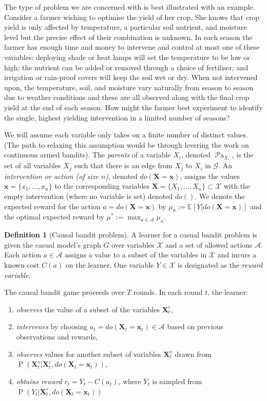 \documentclass[11pt,a4paper,oneside]{book}
\newcommand{\actions}{\mathcal{A}}
\newcommand{\actionspace}{\mathcal{A}}
\newcommand{\E}[1]{\mathbb E\left[{#1}\right]}
\renewcommand{\P}[1]{\operatorname{P}\left(#1\right)}
\newcommand{\parents}[1]{\operatorname{\mathcal{P}a}_{#1}}
\renewcommand{\vec}[1]{\boldsymbol{#1}}
\theoremstyle{plain}
\theoremstyle{definition}
\newtheorem{definition}[theorem]{Definition}
\begin{document}
The type of problem we are concerned with is best illustrated with an example. Consider a farmer wishing to optimise the yield of her crop. She knows that crop yield is only affected by temperature, a particular soil nutrient, and moisture level but the precise effect of their combination is unknown. In each season the farmer has enough time and money to intervene and control at most one of these
variables: deploying shade or heat lamps will set the temperature to be low or high; the nutrient can be added or removed through a choice of fertiliser; and irrigation or rain-proof covers will keep the soil wet or dry. When not intervened upon, the temperature, soil, and moisture vary naturally from season to season due to weather conditions and these are all observed along with the final crop yield at the end of each season. How might the farmer best experiment to identify the single, highest yielding intervention in a limited number of seasons?

We will assume each variable only takes on a finite number of distinct values. (The path to relaxing this assumption would be through levering the work on continuous armed bandits). The \emph{parents} of a variable $X_i$, denoted $\parents{X_i}$, is the set of all variables $X_j$ such that there is an edge from $X_j$ to $X_i$ in $\mathcal{G}$. An \emph{intervention or action (of size $n$)}, denoted $do(\vec{X}=\vec{x})$, assigns the values $\vec{x}=\{x_1, \ldots, x_n\}$ to the corresponding variables $\vec{X}=\{X_1, \ldots, X_n\} \subset \mathcal{X}$ with the empty intervention (where no variable is set) denoted $do()$. We denote the expected reward for the action $a = do(\vec{X} = \vec{x})$ by $\mu_{a} := \E{Y | do(\vec{X} = \vec{x})}$ and 
the optimal expected reward by $\mu^* := \max_{a\in\actions} \mu_{a}$. 

\vspace*{.5cm}
\begin{definition}[Causal bandit problem]
A learner for a casual bandit problem is given the casual model’s graph $G$ over variables $\mathcal{X}$ and a set of allowed actions $\actionspace$. Each action $a \in \actionspace$ assigns a value to a subset of the variables in $\mathcal{X}$ and incurs a known cost $C(a)$ on the learner. One variable $Y \in \mathcal{X}$ is designated as the \emph{reward variable}.

The causal bandit game proceeds over $T$ rounds. In each round $t$, the learner:
\begin{enumerate}
\item \emph{observes} the value of a subset of the variables $\vec{X}^c_t$,
\item \emph{intervenes} by choosing $a_t = do(\vec{X}_t = \vec{x}_t) \in \mathcal{A}$ based on previous observations and rewards, 
\item \emph{observes} values for another subset of variables $\vec{X}^o_t$ drawn from $\P{\vec{X}^o_t |\vec{X}^c_t, do(\vec{X}_t = \vec{x}_t)}$,
\item \emph{obtains reward} $r_t = Y_t - C(a_t)$, where $Y_t$ is sampled from $\P{Y_t| \vec{X}^c_t, do(\vec{X}_t = \vec{x}_t)}$
\end{enumerate} 
\end{definition}
\end{document}
